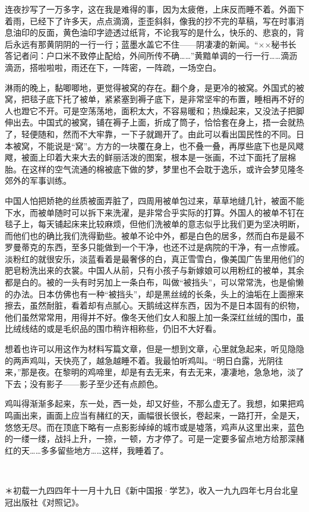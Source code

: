 \par 连夜抄写了一万多字，这在我是难得的事，因为太疲倦，上床反而睡不着。外面下着雨，已经下了许多天，点点滴滴，歪歪斜斜，像我的抄不完的草稿，写在时事消息油印的反面，黄色油印字迹透过纸背，不论我写的是什么，快乐的、悲哀的，背后永远有那黄阴阴的一行一行；蓝墨水盖它不住——阴凄凄的新闻。“××秘书长答记者问：户口米不致停止配给，外间所传不确……”黄黯单调的一行一行……滴沥滴沥，搭啦啦啦，雨还在下，一阵密，一阵疏，一场空白。
\par 淋雨的晚上，黏唧唧地，更觉得被窝的存在。翻个身，是更冷的被窝。外国式的被窝，把毯子底下托了被单，紧紧塞到褥子底下，是非常坚牢的布置，睡相再不好的人也蹬它不开。可是空荡荡地，面积太大，不容易暖和；热燥起来，又没法子把脚伸出去。中国式的被窝，铺在褥子上面，折成了筒子，恰恰套在身上，捂一会就热了，轻便随和，然而不大牢靠，一下子就踢开了。由此可以看出国民性的不同。日本被窝，不能说是“窝”。方方的一块覆在身上，也不叠一叠，再厚些底下也是风飕飕，被面上印着大来大去的鲜丽活泼的图案，根本是一张画，不过下面托了层棉胎。在这样的空气流通的棉被底下做的梦，梦里也不会耽于逸乐，或许会梦见隆冬郊外的军事训练。
\par 中国人怕把娇艳的丝质被面弄脏了，四周用被单包过来，草草地缝几针，被面不能下水，而被单随时可以拆下来洗濯，是非常合乎实际的打算。外国人的被单不钉在毯子上，每天铺起床来比较麻烦，但他们洗被单的意志似乎比我们更为坚决明断，而他们也的确比我们洗得勤些。被单不论中外，都是白色的居多，然而白布是最不罗曼蒂克的东西，至多只能做到一个干净，也还不过是病院的干净，有一点惨戚。淡粉红的就很安乐，淡蓝看着是最奢侈的白，真正雪雪白，像美国广告里用他们的肥皂粉洗出来的衣裳。中国人从前，只有小孩子与新嫁娘可以用粉红的被单，其余都是白的。被的一头有时另加上一条白布，叫做“被挡头”，可以常常洗，也是偷懒的办法。日本仿佛也有一种“被挡头”，却是黑丝绒的长条，头上的油垢在上面擦来擦去，虽然耐脏，看着却有点腻心。天鹅绒这样东西，因为不是日本固有的织物，他们虽然常常用，用得并不好。像冬天他们女人和服上加一条深红丝绒的围巾，虽比绒线结的或是毛织品的围巾稍许相称些，仍旧不大好看。
\par 想着也许可以用这作为材料写篇文章，但是一想到文章，心里就急起来，听见隐隐的两声鸡叫，天快亮了，越急越睡不着。我最怕听鸡叫。“明日白露，光阴往来，”那是夜。在黎明的鸡啼里，却是有去无来，有去无来，凄凄地，急急地，淡了下去；没有影子——影子至少还有点颜色。
\par 鸡叫得渐渐多起来，东一处，西一处，却又好些，不那么虚无了。我想，如果把鸡鸣画出来，画面上应当有赭红的天，画幅很长很长，卷起来，一路打开，全是天，悠悠无尽。而在顶底下略有一点影影绰绰的城市或是墟落，鸡声从这里出来，蓝色的一缕一缕，战抖上升，一捺，一顿，方才停了。可是一定要多留点地方给那深赭红的天……多多留些地方……这样，我睡着了。
\par  
\par ＊初载一九四四年十一月十九日《新中国报·学艺》，收入一九九四年七月台北皇冠出版社《对照记》。


